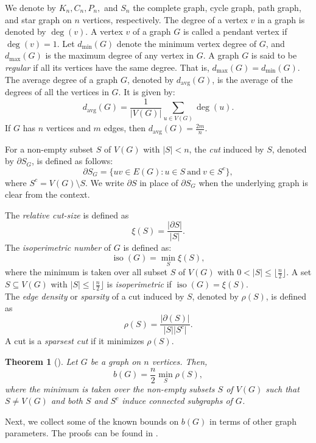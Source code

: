 \documentclass[12pt]{article}
\newtheorem{theorem}{Theorem}[section]
\DeclareMathOperator{\iso}{iso}
\DeclareMathOperator{\avg}{avg}
\begin{document}
We denote by \(K_n, C_n, P_n,\) and \(S_n\) the complete graph, cycle graph, path graph, and star graph on \(n\) vertices, respectively. The degree of a vertex $v$ in a graph is denoted by $\deg(v)$. A vertex $v$ of a graph $G$ is called a pendant vertex if $\deg(v)= 1$.  Let  $d_{\min}(G)$ denote the minimum vertex degree of $G$, and $d_{\max}(G)$ is the maximum degree of any vertex in $G$.  A graph $G$ is said to be \textit{regular} if all its vertices have the same degree. That is,  $d_{\max}(G)=d_{\min}(G)$. The average degree of a graph $G$, denoted by $d_{\avg}(G)$, is the average of the degrees of all the vertices in $G$. It is given by:
$$
d_{\avg}(G)=\frac{1}{\vert V(G) \vert} \sum\limits_{u \in V(G)} \deg(u).
$$
If $G$ has $n$ vertices and $m$ edges, then $d_{\avg}(G)=\frac{2m}{n}.$


  For a non-empty subset $S$ of $V(G)$ with $\vert S \vert < n$, the \textit{cut} induced by $S$, denoted by $\partial S_G$, is
defined as follows: $$\partial S_G = \biggl\{uv \in E(G) : u \in S ~\mbox{and}~v \in S^c\biggl\},$$ where $S^c = V(G) \setminus S$. 
We write $\partial S$ in place of $\partial S_G$ when the underlying graph is clear from the context.

The \textit{relative cut-size} is defined as $$\xi (S) =  \frac{\vert \partial S \vert }{\vert S \vert}.$$  The \textit{isoperimetric number} of $G$ is defined as: $$\iso(G) = \min_S \xi (S),$$ where the minimum is taken over all subset $S$ of $V(G)$ with $0 < \vert S \vert  \leq   \lfloor \frac{n}{2}\rfloor.$  A set $S \subseteq V(G)$ with $\vert S \vert \leq  \lfloor \frac{n}{2}\rfloor $ is \textit{isoperimetric} if $\iso(G) = \xi (S).$\\
The \textit{edge density} or \textit{sparsity} of a cut induced by $S$, denoted by $\rho(S)$, is defined as $$\rho(S) = \frac{\vert \partial(S) \vert }{ \vert S \vert \vert S^c \vert}.$$ 
A cut is a \textit{sparsest cut} if it minimizes $\rho(S)$. 
\begin{theorem}[{\cite{enide-geir-2024}}]\label{main theorem} Let $G$ be a graph on $n$ vertices. Then, 
     $$ b(G)=\frac{n}{2} \min_S \rho(S),$$
where the minimum is taken over the non-empty subsets $S$ of $V(G)$ such that $S \neq V(G)$ and both $S$ and $S^c$ induce connected subgraphs of $G$. 
\end{theorem}

Next, we collect some of the known bounds on $b(G)$ in terms of other graph parameters. The proofs can be found in \cite{enide-geir-2024}.  
\end{document}
